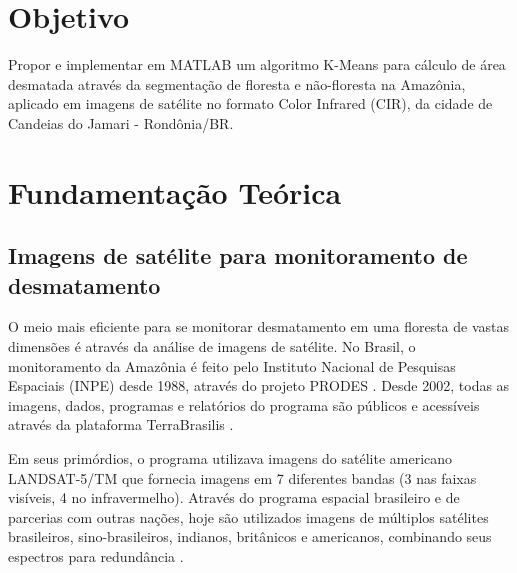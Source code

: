 \documentclass[11pt]{article}
\date{Junho 2023} %
\begin{document}
\maketitle

\section{Objetivo}

Propor e implementar em MATLAB um algoritmo K-Means para cálculo de área desmatada através da segmentação de floresta e não-floresta na Amazônia, aplicado em imagens de satélite no formato Color Infrared (CIR), da cidade de Candeias do Jamari - Rondônia/BR.


\section{Fundamentação Teórica}

\subsection{Imagens de satélite para monitoramento de desmatamento}

O meio mais eficiente para se monitorar desmatamento em uma floresta de vastas dimensões é através da análise de imagens de satélite. No Brasil, o monitoramento da Amazônia é feito pelo Instituto Nacional de Pesquisas Espaciais (INPE) desde 1988, através do projeto PRODES \cite{inpe:prodes:2022}. Desde 2002, todas as imagens, dados, programas e relatórios do programa são públicos e acessíveis através da plataforma TerraBrasilis \cite{inpe:brasilis:2023}.

Em seus primórdios, o programa utilizava imagens do satélite americano LANDSAT-5/TM que fornecia imagens em 7 diferentes bandas (3 nas faixas visíveis, 4 no infravermelho). Através do programa espacial brasileiro e de parcerias com outras nações, hoje são utilizados imagens de múltiplos satélites brasileiros, sino-brasileiros, indianos, britânicos e americanos, combinando seus espectros para redundância \cite{inpe:prodes:2022}.

\end{document}
